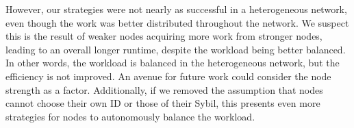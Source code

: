 \documentclass[10pt,conference]{IEEEtran}
\begin{document}
	However, our strategies were not nearly as successful in a heterogeneous network, even though the work was better distributed throughout the network.
	We suspect this is the result of weaker nodes acquiring more work from stronger nodes, leading to an overall longer runtime, despite the workload being better balanced.
	In other words, the workload is balanced in the heterogeneous network, but the efficiency is not improved.
	An avenue for future work could consider the node strength as a factor.
	Additionally, if we removed the assumption that nodes cannot choose their own ID or those of their Sybil, this presents even more strategies for nodes to autonomously balance the workload.


\end{document}
